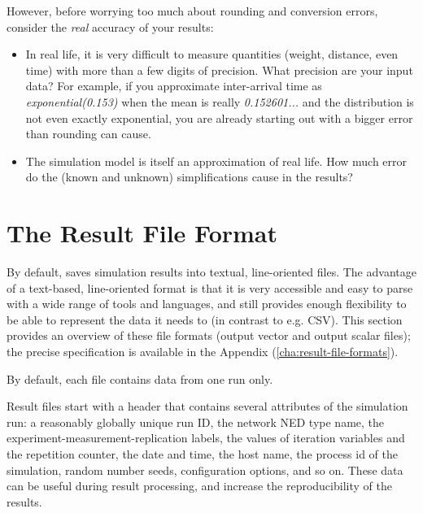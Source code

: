 However, before worrying too much about rounding and conversion errors,
consider the \textit{real} accuracy of your results:

\begin{itemize}
  \item In real life, it is very difficult to measure quantities (weight, distance,
     even time) with more than a few digits of precision. What precision
     are your input data? For example, if you approximate inter-arrival
     time as \textit{exponential(0.153)} when the mean is really
     \textit{0.152601...} and the distribution is not even exactly exponential,
     you are already starting out with a bigger error than rounding can cause.

  \item The simulation model is itself an approximation of real life. How much
     error do the (known and unknown) simplifications cause in the results?
\end{itemize}



\section{The {\opp} Result File Format}
\label{sec:ana-sim:omnetpp-result-file-format}

By default, {\opp} saves simulation results into textual, line-oriented files.
The advantage of a text-based, line-oriented format is that it is very
accessible and easy to parse with a wide range of tools and languages, and
still provides enough flexibility to be able to represent the data it
needs to (in contrast to e.g. CSV). This section provides an overview of
these file formats (output vector and output scalar files); the precise
specification is available in the Appendix (\ref{cha:result-file-formats}).


By default, each file contains data from one run only.

Result files start with a header that contains several attributes of the
simulation run: a reasonably globally unique run ID, the network NED type
name, the experiment-measurement-replication labels, the values of
iteration variables and the repetition counter, the date and time, the host
name, the process id of the simulation, random number seeds, configuration
options, and so on. These data can be useful during result processing, and
increase the reproducibility of the results.

